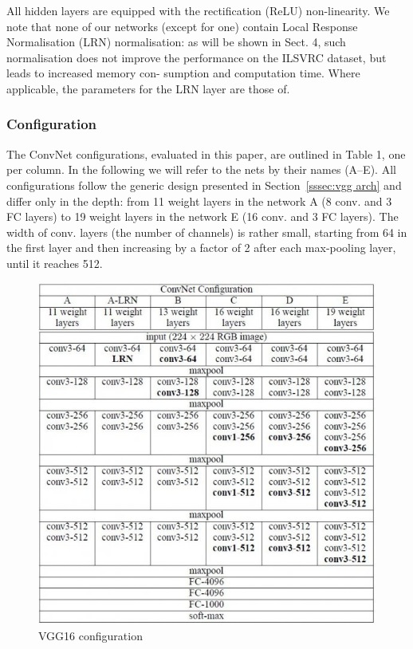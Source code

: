 \documentclass[11pt]{article}
\begin{document}
	All hidden layers are equipped with the rectification (ReLU) non-linearity.
	We note that none of our networks (except for one) contain Local Response
	Normalisation (LRN) normalisation: as will be shown in Sect. 4, such
	normalisation does not improve the performance on the ILSVRC dataset, but
	leads to increased memory con- sumption and computation time. Where
	applicable, the parameters for the LRN layer are those of.

	\subsubsection{Configuration}

	The ConvNet configurations, evaluated in this paper, are outlined in Table
	1, one per column. In the following we will refer to the nets by their names
	(A–E).  All configurations follow the generic design presented in
	Section~\ref{sssec:vgg arch} and differ only in the depth: from 11 weight
	layers in the network A (8 conv. and 3 FC layers) to 19 weight layers in the
	network E (16 conv. and 3 FC layers). The width of conv. layers (the number
	of channels) is rather small, starting from 64 in the first layer and then
	increasing by a factor of 2 after each max-pooling layer, until it reaches
	512.

	\begin{figure}[h]
		\centering
		\includegraphics[width=0.8\linewidth]{imgs/vgg16_conf}
		\caption{VGG16 configuration}%
		\label{fig:vgg16_conf}
	\end{figure}
\end{document}
